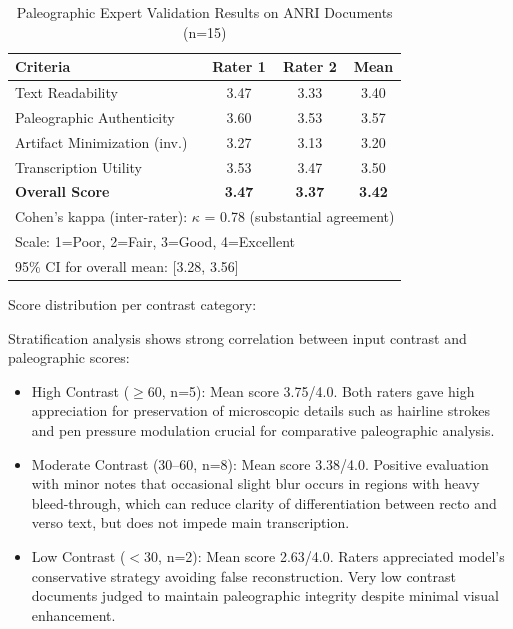 \documentclass[journal]{IEEEtran}
\begin{document}
\begin{table}[!t]
\renewcommand{\arraystretch}{1.3}
\caption{Paleographic Expert Validation Results on ANRI Documents (n=15)}
\label{table:anri_expert_validation}
\centering
\small
\begin{tabular}{|l|c|c|c|}
\hline
\textbf{Criteria} & \textbf{Rater 1} & \textbf{Rater 2} & \textbf{Mean} \\
\hline
Text Readability & 3.47 & 3.33 & 3.40 \\
Paleographic Authenticity & 3.60 & 3.53 & 3.57 \\
Artifact Minimization (inv.) & 3.27 & 3.13 & 3.20 \\
Transcription Utility & 3.53 & 3.47 & 3.50 \\
\hline
\textbf{Overall Score} & \textbf{3.47} & \textbf{3.37} & \textbf{3.42} \\
\hline
\multicolumn{4}{l}{\footnotesize Cohen's kappa (inter-rater): $\kappa$ = 0.78 (substantial agreement)} \\
\multicolumn{4}{l}{\footnotesize Scale: 1=Poor, 2=Fair, 3=Good, 4=Excellent} \\
\multicolumn{4}{l}{\footnotesize 95\% CI for overall mean: [3.28, 3.56]} \\
\end{tabular}
\end{table}

Score distribution per contrast category:

Stratification analysis shows strong correlation between input contrast and paleographic scores:

\begin{itemize}
    \item High Contrast ($\geq$60, n=5): Mean score 3.75/4.0. Both raters gave high appreciation for preservation of microscopic details such as hairline strokes and pen pressure modulation crucial for comparative paleographic analysis.
    
    \item Moderate Contrast (30--60, n=8): Mean score 3.38/4.0. Positive evaluation with minor notes that occasional slight blur occurs in regions with heavy bleed-through, which can reduce clarity of differentiation between recto and verso text, but does not impede main transcription.
    
    \item Low Contrast ($<$30, n=2): Mean score 2.63/4.0. Raters appreciated model's conservative strategy avoiding false reconstruction. Very low contrast documents judged to maintain paleographic integrity despite minimal visual enhancement.
\end{itemize}
\end{document}
